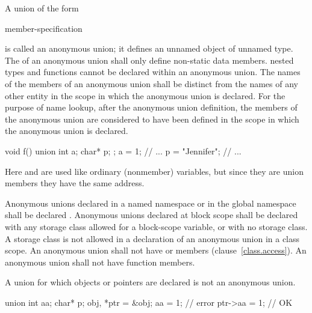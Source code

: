 \pnum
{}%
A union of the form

\begin{ncbnftab}
 \terminal{\{} member-specification \terminal{\} ;}
\end{ncbnftab}

is called an anonymous union; it defines an unnamed object of unnamed
type. The  of an anonymous union shall
only define non-static data members.
\enternote
nested types and functions cannot be declared within an anonymous union.
\exitnote
The names of the members of an anonymous union shall be distinct from
the names of any other entity in the scope in which the anonymous union
is declared. For the purpose of name lookup, after the anonymous union
definition, the members of the anonymous union are considered to have
been defined in the scope in which the anonymous union is declared.
%
\enterexample

\begin{codeblock}
void f()
{
    union { int a; char* p; };
    a = 1;
    // ...
    p = "Jennifer";
    // ...
}
\end{codeblock}

Here  and  are used like ordinary (nonmember)
variables, but since they are union members they have the same address.
\exitexample

\pnum
{}%
%
Anonymous unions declared in a named namespace or in the global
namespace shall be declared . Anonymous unions declared at
block scope shall be declared with any storage class allowed for a
block-scope variable, or with no storage class. A storage class is not
allowed in a declaration of an anonymous union in a class scope.
%
%
An anonymous union shall not have  or 
members (clause~\ref{class.access}). An anonymous union shall not have
function members.

\pnum
A union for which objects or pointers are declared is not an anonymous union.
\enterexample

\begin{codeblock}
union { int aa; char* p; } obj, *ptr = &obj;
aa = 1;                         // error
ptr->aa = 1;                    // OK
\end{codeblock}

